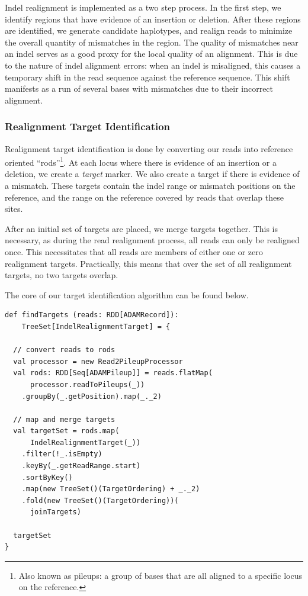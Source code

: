 \documentclass[masters]{ucbthesis}
\begin{document}
Indel realignment is implemented as a two step process. In the first step, we identify regions that have evidence of an insertion or
deletion. After these regions are identified, we generate candidate haplotypes, and realign reads to minimize the overall quantity
of mismatches in the region. The quality of mismatches near an indel serves as a good proxy for the local quality of an alignment.
This is due to the nature of indel alignment errors: when an indel is misaligned, this causes a temporary shift in the read sequence
against the reference sequence. This shift manifests as a run of several bases with mismatches due to their incorrect alignment.

\subsubsection{Realignment Target Identification}
\label{sec:realignment-target-identification}

Realignment target identification is done by converting our reads into reference oriented ``rods''\footnote{Also known as pileups: a
group of bases that are all aligned to a specific locus on the reference.}. At each locus where there is evidence of an insertion or a
deletion, we create a \emph{target} marker. We also create a target if there is evidence of a mismatch. These targets contain the indel
range or mismatch positions on the reference, and the range on the reference covered by reads that overlap these sites.

After an initial set of targets are placed, we merge targets together. This is necessary, as during the read realignment process, all
reads can only be realigned once. This necessitates that all reads are members of either one or zero realignment targets. Practically,
this means that over the set of all realignment targets, no two targets overlap.

The core of our target identification algorithm can be found below.

\begin{lstlisting}
def findTargets (reads: RDD[ADAMRecord]):
    TreeSet[IndelRealignmentTarget] = {

  // convert reads to rods
  val processor = new Read2PileupProcessor
  val rods: RDD[Seq[ADAMPileup]] = reads.flatMap(
      processor.readToPileups(_))
    .groupBy(_.getPosition).map(_._2)

  // map and merge targets
  val targetSet = rods.map(
      IndelRealignmentTarget(_))
    .filter(!_.isEmpty)
    .keyBy(_.getReadRange.start)
    .sortByKey()
    .map(new TreeSet()(TargetOrdering) + _._2)
    .fold(new TreeSet()(TargetOrdering))(
      joinTargets)

  targetSet
}
\end{lstlisting}
\end{document}
